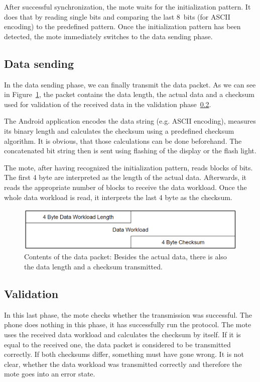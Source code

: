 \documentclass{sig-alternate} %
\begin{document}
After successful synchronization, the mote waits for the initialization pattern.
It does that by reading single bits and comparing the last 8~bits (for ASCII encoding) to the predefined pattern.
Once the initialization pattern has been detected, the mote immediately switches to the data sending phase.

\subsection{Data sending}
\label{sub:data_sending}

In the data sending phase, we can finally transmit the data packet.
As we can see in Figure~\ref{fig:data_packet}, the packet contains the data length, the actual data and a checksum used for validation of the received data in the validation phase~\ref{sub:validation}.

The Android application encodes the data string (e.g. ASCII encoding), measures its binary length and calculates the checksum using a predefined checksum algorithm.
It is obvious, that those calculations can be done beforehand.
The concatenated bit string then is sent using flashing of the display or the flash light.

The mote, after having recognized the initialization pattern, reads blocks of bits.
The first 4 byte are interpreted as the length of the actual data.
Afterwards, it reads the appropriate number of blocks to receive the data workload.
Once the whole data workload is read, it interprets the last 4 byte as the checksum.

\begin{figure}
	\centering
	\includegraphics[scale=.3]{images/data_packet.png}
	\caption{Contents of the data packet: Besides the actual data, there is also the data length and a checksum transmitted.}
	\label{fig:data_packet}
\end{figure}

\subsection{Validation}
\label{sub:validation}

In this last phase, the mote checks whether the transmission was successful.
The phone does nothing in this phase, it has successfully run the protocol.
The mote uses the received data workload and calculates the checksum by itself.
If it is equal to the received one, the data packet is considered to be transmitted correctly.
If both checksums differ, something must have gone wrong.
It is not clear, whether the data workload was transmitted correctly and therefore the mote goes into an error state.
\end{document}
